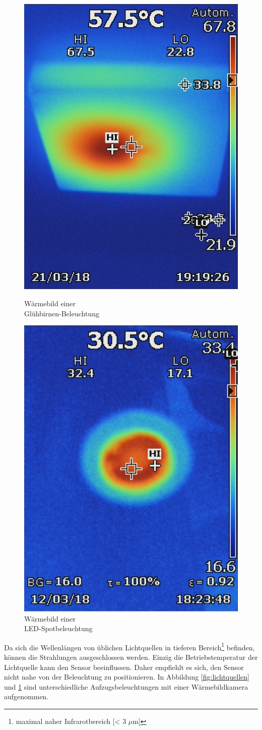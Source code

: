 \begin{figure}[!ht]
	\centering
	\begin{minipage}[b]{0.49\linewidth}
	\centering
	\includegraphics[width=0.5\linewidth]{fig/Lichtquellen.jpg}
	\caption{Wärmebild einer\\ Glühbirnen-Beleuchtung}
	\label{fig:lichtquellen}
	\end{minipage}
	\hfill
	\begin{minipage}[b]{0.49\linewidth}
	\centering
	\includegraphics[width=0.5\linewidth]{fig/Lichtquelle.png}
	\caption{Wärmebild einer\\ LED-Spotbeleuchtung}
	\label{fig:m2lichtquelle}
	\end{minipage}
\end{figure}

Da sich die Wellenlängen von üblichen Lichtquellen in tieferen Bereich\footnote[11]{maximal naher Infrarotbereich [< 3 $\mu$m]} befinden, können die Strahlungen ausgeschlossen werden. Einzig die Betriebstemperatur der Lichtquelle kann den Sensor beeinflussen. Daher empfiehlt es sich, den Sensor nicht nahe von der Beleuchtung zu positionieren. In Abbildung \ref{fig:lichtquellen}  und \ref{fig:m2lichtquelle} sind unterschiedliche Aufzugsbeleuchtungen mit einer Wärmebildkamera aufgenommen.



